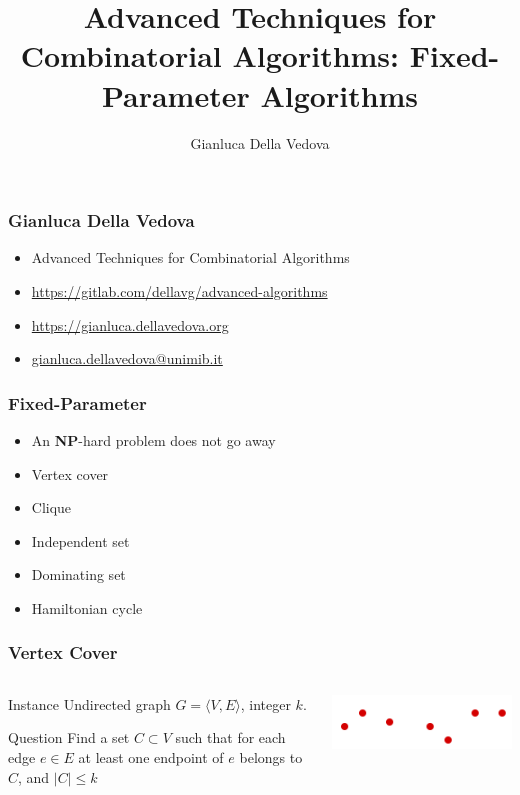 \documentclass[12pt,aspectratio=169]{beamer}
\author{Gianluca Della Vedova}
\title[Advanced Algorithms]{Advanced Techniques for Combinatorial Algorithms:
Fixed-Parameter Algorithms}
\institute[]{Univ. Milano--Bicocca\\
  \texttt{https://gianluca.dellavedova.org}}
\begin{document}
\begin{frame}
  \titlepage
\end{frame}


\begin{frame}\frametitle{Gianluca Della Vedova}
  \begin{itemize}
  \item
                Advanced Techniques for Combinatorial Algorithms
\item
{\small\url{https://gitlab.com/dellavg/advanced-algorithms}}
  \item
{\small\url{https://gianluca.dellavedova.org}}
  \item
{\small\url{gianluca.dellavedova@unimib.it}}
  \end{itemize}
\end{frame}

\begin{frame}\frametitle{Fixed-Parameter}
  \begin{itemize}
  \item
    An \textbf{NP}-hard problem does not go away
  \item
    Vertex cover
  \item
    Clique
  \item
    Independent set
  \item
    Dominating set
  \item
    Hamiltonian cycle
  \end{itemize}
\end{frame}

\begin{frame}\frametitle{Vertex Cover }
\begin{columns} 
  \begin{column}{0.48\textwidth}
  \begin{block}{Instance}
    Undirected graph $G=\langle V,E \rangle$, integer $k$.
  \end{block}
  \begin{block}{Question}
    Find a set $C\subset V$ such that for each edge $e\in E$ at least one endpoint of $e$
    belongs to $C$, and $|C|\le k$
  \end{block}
\end{column}
    
    \begin{column}{0.48\textwidth}
      \centering

  \includegraphics[height=0.2\textheight]{img/Vertex-cover}
\end{column}
\end{columns}
\end{frame}
\end{document}
